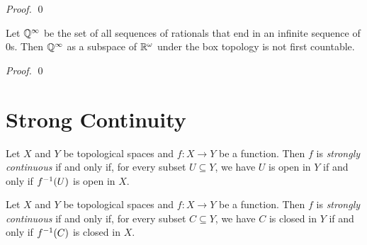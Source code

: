 \begin{proof}
    \pf
    \qed
\end{proof}

\begin{example}[Choice]
    Let $\mathbb{Q}^\infty$ be the set of all sequences of rationals that end in an
    infinite sequence of 0s. Then $\mathbb{Q}^\infty$ as a subspace of $\mathbb{R}^\omega$
    under the box topology is not first countable.

    \begin{proof}
        \pf
        \qed
    \end{proof}
\end{example}

\section{Strong Continuity}

\begin{definition}
    Let $X$ and $Y$ be topological spaces and $f : X \rightarrow Y$ be a function. Then $f$ is \emph{strongly continuous} if and only if, for every subset $U \subseteq Y$,
    we have $U$ is open in $Y$ if and only if ${f}^{-1}(U)$ is open in $X$.
\end{definition}

\begin{proposition}
    Let $X$ and $Y$ be topological spaces and $f : X \rightarrow Y$ be a function. Then $f$ is \emph{strongly continuous} if and only if, for every subset $C \subseteq Y$,
    we have $C$ is closed in $Y$ if and only if ${f}^{-1}(C)$ is closed in $X$.
\end{proposition}

